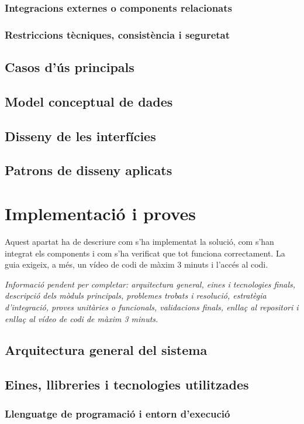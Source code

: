 \documentclass[11pt,a4paper]{article}
\newcommand{\requiredinfo}[1]{%
  \vspace{0.4em}%
  {\color{placeholdergray}\textit{Informaci\'o pendent per completar: #1.}}\par
}
\newcommand{\sectionintro}[1]{%
  \vspace{0.25em}%
  #1\par
}
\begin{document}
\subsubsection{Integracions externes o components relacionats}
\subsubsection{Restriccions t\`ecniques, consist\`encia i seguretat}

\subsection{Casos d'\'us principals}
\subsection{Model conceptual de dades}
\subsection{Disseny de les interf\'icies}
\subsection{Patrons de disseny aplicats}

\section{Implementaci\'o i proves}
\sectionintro{Aquest apartat ha de descriure com s'ha implementat la soluci\'o, com s'han integrat els components i com s'ha verificat que tot funciona correctament. La guia exigeix, a m\'es, un v\'ideo de codi de m\`axim 3 minuts i l'acc\'es al codi.}
\requiredinfo{arquitectura general, eines i tecnologies finals, descripci\'o dels m\`oduls principals, problemes trobats i resoluci\'o, estrat\`egia d'integraci\'o, proves unit\`aries o funcionals, validacions finals, enlla\c{c} al repositori i enlla\c{c} al v\'ideo de codi de m\`axim 3 minuts}

\subsection{Arquitectura general del sistema}
\subsection{Eines, llibreries i tecnologies utilitzades}
\subsubsection{Llenguatge de programaci\'o i entorn d'execuci\'o}
\end{document}
